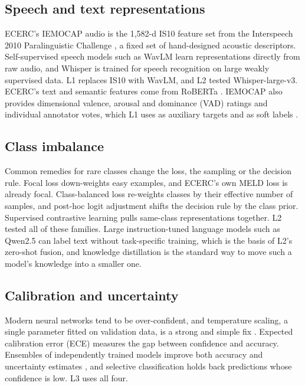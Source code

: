 \documentclass[11pt,a4paper]{article}
\begin{document}
\subsection{Speech and text representations}

ECERC's IEMOCAP audio is the 1,582-d IS10 feature set from the Interspeech 2010 Paralinguistic Challenge \cite{is10}, a fixed set of hand-designed acoustic descriptors. Self-supervised speech models such as WavLM \cite{wavlm} learn representations directly from raw audio, and Whisper \cite{whisper} is trained for speech recognition on large weakly supervised data. L1 replaces IS10 with WavLM, and L2 tested Whisper-large-v3. ECERC's text and semantic features come from RoBERTa \cite{roberta}. IEMOCAP also provides dimensional valence, arousal and dominance (VAD) ratings and individual annotator votes, which L1 uses as auxiliary targets and as soft labels \cite{softlabels}.

\subsection{Class imbalance}

Common remedies for rare classes change the loss, the sampling or the decision rule. Focal loss \cite{focal} down-weights easy examples, and ECERC's own MELD loss is already focal. Class-balanced loss \cite{cbloss} re-weights classes by their effective number of samples, and post-hoc logit adjustment \cite{logitadj} shifts the decision rule by the class prior. Supervised contrastive learning \cite{supcon} pulls same-class representations together. L2 tested all of these families. Large instruction-tuned language models such as Qwen2.5 \cite{qwen25} can label text without task-specific training, which is the basis of L2's zero-shot fusion, and knowledge distillation \cite{distill} is the standard way to move such a model's knowledge into a smaller one.

\subsection{Calibration and uncertainty}

Modern neural networks tend to be over-confident, and temperature scaling, a single parameter fitted on validation data, is a strong and simple fix \cite{guo2017}. Expected calibration error (ECE) \cite{ece} measures the gap between confidence and accuracy. Ensembles of independently trained models improve both accuracy and uncertainty estimates \cite{deepens}, and selective classification \cite{selective} holds back predictions whose confidence is low. L3 uses all four.
\end{document}

